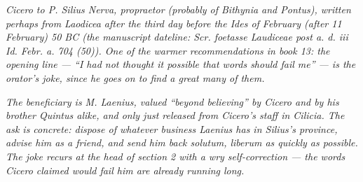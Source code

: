 
\textit{Cicero to P. Silius Nerva, propraetor (probably of Bithynia
and Pontus), written perhaps from Laodicea after the third day before
the Ides of February (after 11 February) 50 BC (the manuscript
dateline: \textit{Scr. foetasse Laudiceae post a. d. iii Id. Febr.
a. 704 (50)}). One of the warmer recommendations in book 13: the
opening line --- ``I had not thought it possible that words should
fail me'' --- is the orator's joke, since he goes on to find a great
many of them.}

\textit{The beneficiary is M. Laenius, valued ``beyond believing''
by Cicero and by his brother Quintus alike, and only just released
from Cicero's staff in Cilicia. The ask is concrete: dispose of
whatever business Laenius has in Silius's province, advise him as a
friend, and send him back \textit{solutum, liberum} as quickly as
possible. The joke recurs at the head of section 2 with a wry
self-correction --- the words Cicero claimed would fail him are
already running long.}
